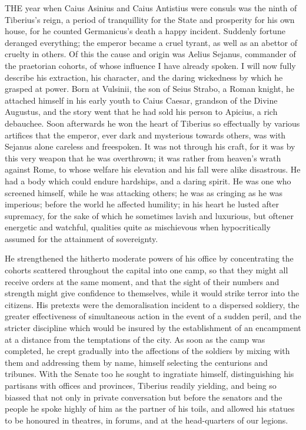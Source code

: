 THE year when Caius Asinius and Caius Antistius were consuls was the ninth of Tiberius's reign, a period of tranquillity for the State and prosperity for his own house, for he counted Germanicus's death a happy incident. Suddenly fortune deranged everything; the emperor became a cruel tyrant, as well as an abettor of cruelty in others. Of this the cause and origin was Aelius Sejanus, commander of the praetorian cohorts, of whose influence I have already spoken. I will now fully describe his extraction, his character, and the daring wickedness by which he grasped at power. Born at Vulsinii, the son of Seius Strabo, a Roman knight, he attached himself in his early youth to Caius Caesar, grandson of the Divine Augustus, and the story went that he had sold his person to Apicius, a rich debauchee. Soon afterwards he won the heart of Tiberius so effectually by various artifices that the emperor, ever dark and mysterious towards others, was with Sejanus alone careless and freespoken. It was not through his craft, for it was by this very weapon that he was overthrown; it was rather from heaven's wrath against Rome, to whose welfare his elevation and his fall were alike disastrous. He had a body which could endure hardships, and a daring spirit. He was one who screened himself, while he was attacking others; he was as cringing as he was imperious; before the world he affected humility; in his heart he lusted after supremacy, for the sake of which he sometimes lavish and luxurious, but oftener energetic and watchful, qualities quite as mischievous when hypocritically assumed for the attainment of sovereignty.


He strengthened the hitherto moderate powers of his office by concentrating the cohorts scattered throughout the capital into one camp, so that they might all receive orders at the same moment, and that the sight of their numbers and strength might give confidence to themselves, while it would strike terror into the citizens. His pretexts were the demoralisation incident to a dispersed soldiery, the greater effectiveness of simultaneous action in the event of a sudden peril, and the stricter discipline which would be insured by the establishment of an encampment at a distance from the temptations of the city. As soon as the camp was completed, he crept gradually into the affections of the soldiers by mixing with them and addressing them by name, himself selecting the centurions and tribunes. With the Senate too he sought to ingratiate himself, distinguishing his partisans with offices and provinces, Tiberius readily yielding, and being so biassed that not only in private conversation but before the senators and the people he spoke highly of him as the partner of his toils, and allowed his statues to be honoured in theatres, in forums, and at the head-quarters of our legions.


